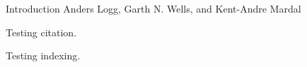               {Introduction}
              {Anders Logg, Garth N. Wells, and Kent-Andre Mardal}

\editornote{[introduction]}

Testing citation.~\cite{Cia78}

Testing indexing.~
